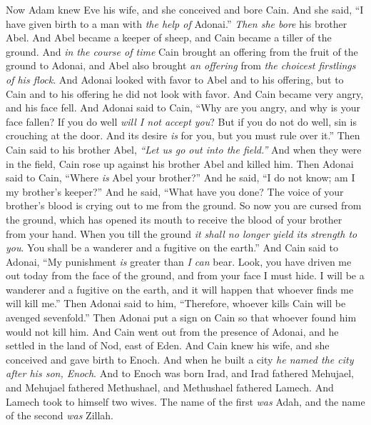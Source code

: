 \begin{biblechapter} %
 Now Adam knew Eve his wife, and she conceived and bore Cain. And she said, “I have given birth to a man with \textit{the help of} Adonai.”
\verse \textit{Then she bore} his brother Abel. And Abel became a keeper of sheep, and Cain became a tiller of the ground.
\verse And \textit{in the course of time} Cain brought an offering from the fruit of the ground to Adonai,
\verse and Abel also brought \textit{an offering} from \textit{the choicest firstlings of his flock}. And Adonai looked with favor to Abel and to his offering,
\verse but to Cain and to his offering he did not look with favor. And Cain became very angry, and his face fell.
\verse And Adonai said to Cain, “Why are you angry, and why is your face fallen?
\verse If you do well \textit{will I not accept you}? But if you do not do well, sin is crouching at the door. And its desire \textit{is} for you, but you must rule over it.”
\verse Then Cain said to his brother Abel, \textit{“Let us go out into the field.”} And when they were in the field, Cain rose up against his brother Abel and killed him.
\verse Then Adonai said to Cain, “Where \textit{is} Abel your brother?” And he said, “I do not know; am I my brother’s keeper?”
\verse And he said, “What have you done? The voice of your brother’s blood is crying out to me from the ground.
\verse So now you are cursed from the ground, which has opened its mouth to receive the blood of your brother from your hand.
\verse When you till the ground \textit{it shall no longer yield its strength to you}. You shall be a wanderer and a fugitive on the earth.”
\verse And Cain said to Adonai, “My punishment \textit{is} greater than \textit{I can} bear.
\verse Look, you have driven me out today from the face of the ground, and from your face I must hide. I will be a wanderer and a fugitive on the earth, and it will happen that whoever finds me will kill me.”
\verse Then Adonai said to him, “Therefore, whoever kills Cain will be avenged sevenfold.” Then Adonai put a sign on Cain so that whoever found him would not kill him.
\verse And Cain went out from the presence of Adonai, and he settled in the land of Nod, east of Eden.
\verse And Cain knew his wife, and she conceived and gave birth to Enoch. And when he built a city \textit{he named the city after his son, Enoch}.
\verse And to Enoch was born Irad, and Irad fathered Mehujael, and Mehujael fathered Methushael, and Methushael fathered Lamech.
\verse And Lamech took to himself two wives. The name of the first \textit{was} Adah, and the name of the second \textit{was} Zillah.

\end{biblechapter}

